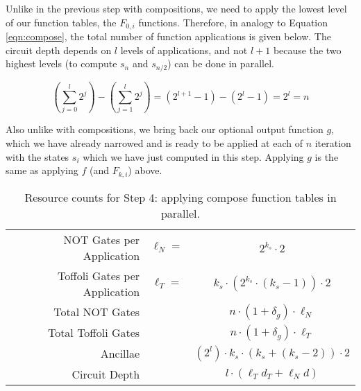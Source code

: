 Unlike in the previous step with compositions, we need to apply the
lowest level of our function tables, the $F_{0,i}$ functions. Therefore,
in analogy to Equation \ref{eqn:compose},
the total number of function applications is given below. The
circuit depth depends on $l$ levels of applications, and not $l+1$
because the two highest levels (to compute $s_n$ and $s_{n/2}$) can be
done in parallel.

\begin{equation}
\left( \sum_{j=0}^{l} 2^j \right) - \left( \sum_{j=1}^{l} 2^j \right)
= (2^{l+1} - 1) - (2^{l} - 1) = 2^l = n
\end{equation}

Also unlike with compositions, we bring back our optional output function
$g$, which we have already narrowed and is ready to be applied at each
of $n$
iteration with the states $s_i$ which we have just computed in this step.
Applying $g$ is the same as applying $f$ (and $F_{k,i}$) above.

\begin{table}
\begin{center}
\begin{tabular}{|r|cc|}
\hline
NOT Gates per Application & $\ell_N = $ & $2^{k_s} \cdot 2$ \\
Toffoli Gates per Application & $\ell_T = $ & $k_s \cdot (2^{k_s}\cdot (k_s-1)) \cdot 2$\\
Total NOT Gates & & $n \cdot (1 + \delta_g) \cdot \ell_N$ \\
Total Toffoli Gates & & $n \cdot (1 + \delta_g) \cdot \ell_T$ \\
Ancillae & & $(2^l)\cdot k_s \cdot (k_s + (k_s - 2)) \cdot 2$\\
Circuit Depth & & $l\cdot(\ell_T d_T + \ell_N d)$\\
\hline
\end{tabular}
\caption{Resource counts for Step 4: applying compose function tables in parallel.}
\end{center}
\end{table}